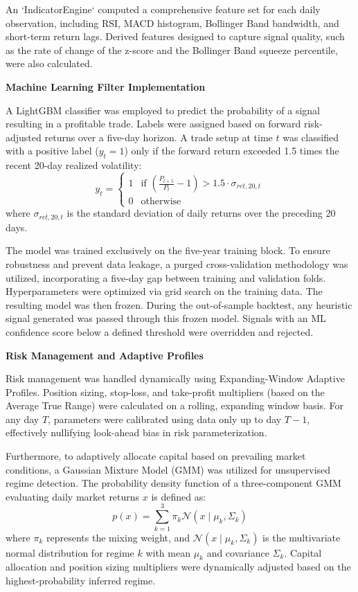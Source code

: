 \documentclass[12pt]{article}
\begin{document}
An `IndicatorEngine` computed a comprehensive feature set for each daily observation, including RSI, MACD histogram, Bollinger Band bandwidth, and short-term return lags. Derived features designed to capture signal quality, such as the rate of change of the z-score and the Bollinger Band squeeze percentile, were also calculated. 

\textbf{Machine Learning Filter Implementation}

A LightGBM classifier was employed to predict the probability of a signal resulting in a profitable trade. Labels were assigned based on forward risk-adjusted returns over a five-day horizon. A trade setup at time $t$ was classified with a positive label ($y_t = 1$) only if the forward return exceeded 1.5 times the recent 20-day realized volatility:
\begin{equation}
y_t = 
\begin{cases} 
1 & \text{if } \left(\frac{P_{t+5}}{P_t} - 1\right) > 1.5 \cdot \sigma_{ret, 20, t} \\ 
0 & \text{otherwise} 
\end{cases}
\end{equation}
where $\sigma_{ret, 20, t}$ is the standard deviation of daily returns over the preceding 20 days.

The model was trained exclusively on the five-year training block. To ensure robustness and prevent data leakage, a purged cross-validation methodology was utilized, incorporating a five-day gap between training and validation folds. Hyperparameters were optimized via grid search on the training data. The resulting model was then frozen. During the out-of-sample backtest, any heuristic signal generated was passed through this frozen model. Signals with an ML confidence score below a defined threshold were overridden and rejected.

\textbf{Risk Management and Adaptive Profiles}

Risk management was handled dynamically using Expanding-Window Adaptive Profiles. Position sizing, stop-loss, and take-profit multipliers (based on the Average True Range) were calculated on a rolling, expanding window basis. For any day $T$, parameters were calibrated using data only up to day $T-1$, effectively nullifying look-ahead bias in risk parameterization. 

Furthermore, to adaptively allocate capital based on prevailing market conditions, a Gaussian Mixture Model (GMM) was utilized for unsupervised regime detection. The probability density function of a three-component GMM evaluating daily market returns $x$ is defined as:
\begin{equation}
p(x) = \sum_{k=1}^{3} \pi_k \mathcal{N}(x \mid \mu_k, \Sigma_k)
\end{equation}
where $\pi_k$ represents the mixing weight, and $\mathcal{N}(x \mid \mu_k, \Sigma_k)$ is the multivariate normal distribution for regime $k$ with mean $\mu_k$ and covariance $\Sigma_k$. Capital allocation and position sizing multipliers were dynamically adjusted based on the highest-probability inferred regime.
\end{document}
